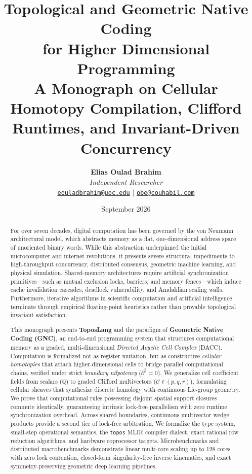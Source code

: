 \documentclass[11pt, a4paper]{report}
\title{\Huge \textbf{Topological and Geometric Native Coding\\for Higher Dimensional Programming}\\[1.5ex]
\Large \textbf{A Monograph on Cellular Homotopy Compilation, Clifford Runtimes, and Invariant-Driven Concurrency}}
\author{
    \textbf{Elias Oulad Brahim} \\
    \textit{Independent Researcher} \\
    \href{mailto:eouladbrahim@uoc.edu}{\texttt{eouladbrahim@uoc.edu}} $\mid$ \href{mailto:obe@couhabil.com}{\texttt{obe@couhabil.com}}
}
\date{September 2026}
\theoremstyle{definition}
\theoremstyle{plain}
\theoremstyle{remark}
\newcommand{\ToposLang}{\textbf{ToposLang}}
\begin{document}
\maketitle

\begin{abstract}
For over seven decades, digital computation has been governed by the von Neumann architectural model, which abstracts memory as a flat, one-dimensional address space of unoriented binary words. While this abstraction underpinned the initial microcomputer and internet revolutions, it presents severe structural impediments to high-throughput concurrency, distributed consensus, geometric machine learning, and physical simulation. Shared-memory architectures require artificial synchronization primitives---such as mutual exclusion locks, barriers, and memory fences---which induce cache invalidation cascades, deadlock vulnerability, and Amdahlian scaling walls. Furthermore, iterative algorithms in scientific computation and artificial intelligence terminate through empirical floating-point heuristics rather than provable topological invariant satisfaction.

This monograph presents \ToposLang{} and the paradigm of \textbf{Geometric Native Coding (GNC)}, an end-to-end programming system that structures computational memory as a graded, multi-dimensional \textit{Directed Acyclic Cell Complex} (DACC). Computation is formalized not as register mutation, but as constructive \textit{cellular homotopies} that attach higher-dimensional cells to bridge parallel computational chains, verified under strict \textit{boundary nilpotency} ($\partial^2 = 0$). We generalize cell coefficient fields from scalars ($\mathbb{Q}$) to graded Clifford multivectors ($\mathcal{C}\ell(p,q,r)$), formulating cellular sheaves that synthesize discrete homology with continuous Lie-group geometry. We prove that computational rules possessing disjoint spatial support closures commute identically, guaranteeing intrinsic lock-free parallelism with zero runtime synchronization overhead. Across shared boundaries, continuous multivector wedge products provide a second tier of lock-free arbitration. We formalize the type system, small-step operational semantics, the \texttt{topos} MLIR compiler dialect, exact rational row reduction algorithms, and hardware coprocessor targets. Microbenchmarks and distributed macrobenchmarks demonstrate linear multi-core scaling up to 128 cores with zero lock contention, closed-form singularity-free inverse kinematics, and exact symmetry-preserving geometric deep learning pipelines.
\end{abstract}

\tableofcontents
\newpage











\end{document}
